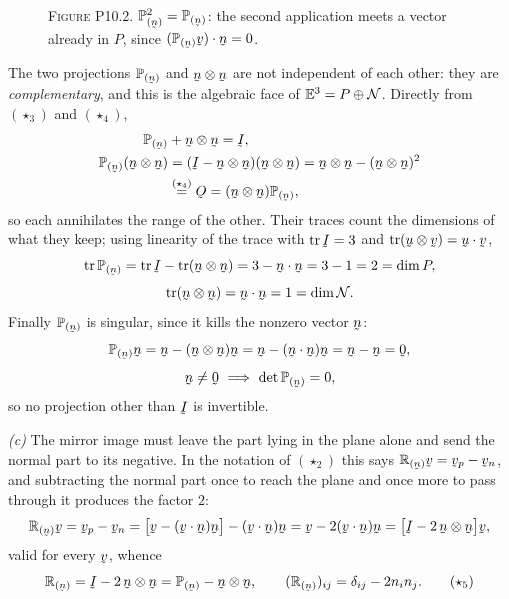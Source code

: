 \begin{solution}
\begin{figure}[htbp]\centering
{}
\\[1.2ex]
{\footnotesize\textsc{Figure P10.2.} $\Proj{\bn}^{2}=\Proj{\bn}$: the second
application meets a vector already in $P$, since
$\ip{(\Proj{\bn}\bv)}{\bn}=0$.}
\end{figure}


The two projections $\Proj{\bn}$ and $\bn\otimes\bn$ are not independent of
each other: they are \emph{complementary}, and this is the algebraic face of
$\mathbb{E}^{3}=P\oplus\mathcal{N}$. Directly from $(\star_3)$ and $(\star_4)$,
\[
\begin{aligned}
   \Proj{\bn}&+\bn\otimes\bn=\I,\\
   \Proj{\bn}(\bn\otimes\bn)&=(\I-\bn\otimes\bn)(\bn\otimes\bn)
   =\bn\otimes\bn-(\bn\otimes\bn)^{2}\\
   &\overset{(\star_4)}{=}\Ob=(\bn\otimes\bn)\Proj{\bn},
\end{aligned}
\]
so each annihilates the range of the other. Their traces count the
dimensions of what they keep; using linearity of the trace with $\tr\I=3$
and $\tr(\bu\otimes\bv)=\ip\bu\bv$,
\[
   \tr\Proj{\bn}=\tr\I-\tr(\bn\otimes\bn)=3-\ip\bn\bn=3-1=2=\dim P,
\]
\[
   \tr(\bn\otimes\bn)=\ip\bn\bn=1=\dim\mathcal{N}.
\]
Finally $\Proj{\bn}$ is singular, since it kills the nonzero vector $\bn$:
\[
   \Proj{\bn}\bn=\bn-(\bn\otimes\bn)\bn=\bn-(\ip\bn\bn)\bn=\bn-\bn=\bze,
\]
\[
   \bn\neq\bze
   \ \Longrightarrow\ \det\Proj{\bn}=0 ,
\]
so no projection other than $\I$ is invertible.

\emph{(c)} The mirror image must leave the part lying in the plane alone and
send the normal part to its negative. In the notation of $(\star_2)$ this
says $\Refl{\bn}\bv=\bv_p-\bv_n$, and subtracting the normal part once to
reach the plane and once more to pass through it produces the factor $2$:
\begin{equation}
   \Refl{\bn}\bv=\bv_p-\bv_n
   =\big[\bv-(\ip\bv\bn)\bn\big]-(\ip\bv\bn)\bn
   =\bv-2(\ip\bv\bn)\bn
   =\big[\I-2\,\bn\otimes\bn\big]\bv,
\end{equation}
valid for every $\bv$, whence
\begin{equation}
   \Refl{\bn}=\I-2\,\bn\otimes\bn=\Proj{\bn}-\bn\otimes\bn,\qquad
   (\Refl{\bn})_{ij}=\dd_{ij}-2n_in_j . \tag{$\star_5$}
\end{equation}



\end{solution}
